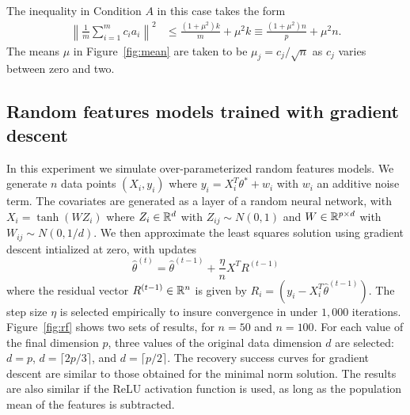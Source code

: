 The inequality in Condition $A$ in this case takes the form
\begin{align*}
  \left\|\frac{1}{m}\sum_{i=1}^m c_i a_i\right\|^2 &\leq \frac{(1+\mu^2)k}{m} + \mu^2 k
   \equiv \frac{(1+\mu^2)n}{p} + \mu^2 n.
\end{align*}
The means $\mu$ in Figure~\ref{fig:mean} are taken to be $\mu_j = c_j / \sqrt{n}$ as $c_j$ varies between zero and two.

\subsection{Random features models trained with gradient descent}

In this experiment we simulate over-parameterized random features models.
We generate $n$ data points $(X_i, y_i)$ where
$y_i = X_i^T \theta^* + w_i$ with $w_i$ an additive noise term. The covariates are generated
as a layer of a random neural network, with $X_i = \tanh(WZ_i)$ where $Z_i \in\mathbb{R}^d$ with $Z_{ij} \sim N(0,1)$
and $W\in\mathbb{R}^{p\times d}$ with $W_{ij} \sim N(0, 1/d)$. We then approximate the least squares
solution using gradient descent intialized at zero, with updates
\begin{equation}
  \hat\theta^{(t)} = \hat\theta^{(t-1)} + \frac{\eta}{n} X^T R^{(t-1)}
\end{equation}
where the residual vector $R^{(t-1)}\in\mathbb{R}^n$ is given by $R_i = (y_i - X_i^ T\hat\theta^{(t-1)})$.
The step size $\eta$ is selected empirically to insure convergence in under $1{,}000$ iterations.
Figure~\ref{fig:rf} shows two sets of results, for $n=50$ and $n=100$. For each value of the final dimension $p$,
three values of the original data dimension $d$ are selected: $d=p$, $d=\lceil 2p/3\rceil$,
and $d=\lceil p/2\rceil$. The recovery success curves for gradient descent are similar to those obtained for the minimal norm solution. The results are also similar if the ReLU activation function is used, as long as the population mean of the features is subtracted.

